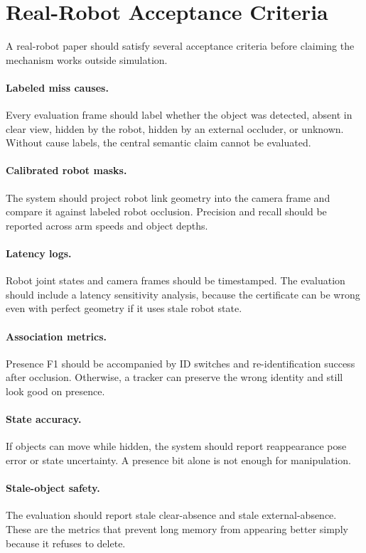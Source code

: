 \documentclass{article}
\begin{document}
\section{Real-Robot Acceptance Criteria}

A real-robot paper should satisfy several acceptance criteria before claiming
the mechanism works outside simulation.

\paragraph{Labeled miss causes.}
Every evaluation frame should label whether the object was detected, absent in
clear view, hidden by the robot, hidden by an external occluder, or unknown.
Without cause labels, the central semantic claim cannot be evaluated.

\paragraph{Calibrated robot masks.}
The system should project robot link geometry into the camera frame and compare
it against labeled robot occlusion. Precision and recall should be reported
across arm speeds and object depths.

\paragraph{Latency logs.}
Robot joint states and camera frames should be timestamped. The evaluation
should include a latency sensitivity analysis, because the certificate can be
wrong even with perfect geometry if it uses stale robot state.

\paragraph{Association metrics.}
Presence F1 should be accompanied by ID switches and re-identification success
after occlusion. Otherwise, a tracker can preserve the wrong identity and still
look good on presence.

\paragraph{State accuracy.}
If objects can move while hidden, the system should report reappearance pose
error or state uncertainty. A presence bit alone is not enough for manipulation.

\paragraph{Stale-object safety.}
The evaluation should report stale clear-absence and stale external-absence.
These are the metrics that prevent long memory from appearing better simply
because it refuses to delete.
\end{document}
